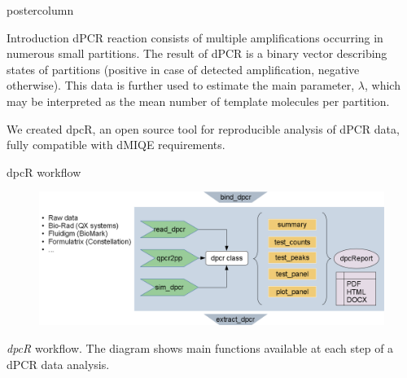 \documentclass[final]{beamer}\usepackage[]{graphicx}\usepackage[]{color}
\newlength{\columnheight}
\begin{document}
\begin{frame}
  \begin{columns}
    \begin{column}{.46\textwidth}
      \begin{beamercolorbox}[center,wd=\textwidth]{postercolumn}
        \begin{minipage}[T]{.95\textwidth}
          \parbox[t][\columnheight]{\textwidth}
            {
    
        
    \begin{block}{Introduction}
      dPCR reaction consists of multiple amplifications occurring in numerous small partitions. The result of dPCR is a binary vector describing states of partitions (positive in case of detected amplification, negative otherwise). This data is further used to estimate the main parameter, $\lambda$, which may be interpreted as the mean number of template molecules per partition.
      
      We created dpcR, an open source tool for reproducible analysis of dPCR data, fully compatible with dMIQE requirements.
    \end{block}
    
    \vfill
    
    \begin{block}{dpcR workflow}

      \begin{figure}
\begin{center}
\includegraphics{figures/dpcR_framework.png}
\end{center}
\label{workflow}
\end{figure}

\textit{dpcR} workflow. The diagram shows main functions available at each step of a dPCR data analysis.

    \end{block}
    \vfill
    
}
\end{minipage}
\end{beamercolorbox}
\end{column}
\end{columns}
\end{frame}
\end{document}
